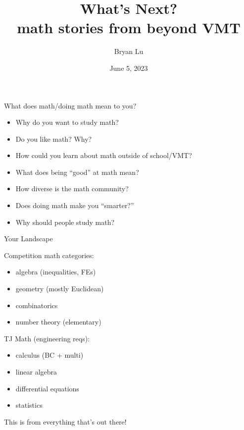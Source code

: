 \documentclass{beamer}
\title[]{What's Next? \\ {\normalsize math stories from beyond VMT}}
\author{Bryan Lu}
\date{June 5, 2023}
\theoremstyle{plain}
\begin{document}
\begin{frame}
\begin{center}
  {\Large {} What does math/doing math mean to you?} 
 \begin{multicols}{2}
    \begin{itemize}
      \item Why do you want to study math?
      \item Do you like math? Why?
      \item How could you learn about math outside of school/VMT?
      \item What does being ``good'' at math mean?
      \item How diverse is the math community?
      \item Does doing math make you ``smarter?''
      \item Why should people study math?
    \end{itemize}
  \end{multicols}
\end{center}
\end{frame}

\begin{frame}
\titlepage
\end{frame}

\usebackgroundtemplate{ }

\begin{frame}{Your Landscape}
  \begin{center}
    \begin{minipage}{0.45\textwidth}
      Competition math categories:
      \begin{itemize}
        \item algebra (inequalities, FEs)
        \item geometry (mostly Euclidean)
        \item combinatorics
        \item number theory (elementary)
      \end{itemize}
    \end{minipage}
    \pause
    \begin{minipage}{0.45\textwidth}
      TJ Math (engineering reqs):
      \begin{itemize}
        \item calculus (BC + multi)
        \item linear algebra 
        \item differential equations 
        \item statistics  
      \end{itemize}            
    \end{minipage}        
  \end{center} 
  \pause
 This is  from everything that's out there!
\end{frame}
\end{document}
